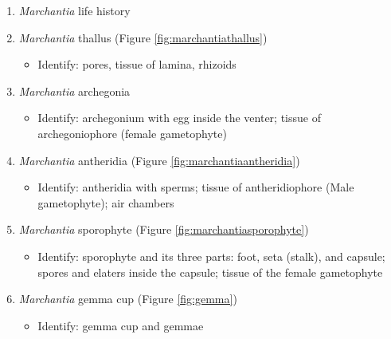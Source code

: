 \documentclass[]{book}
\providecommand{\tightlist}{%
  \setlength{\itemsep}{0pt}\setlength{\parskip}{0pt}}
\theoremstyle{definition}
\theoremstyle{definition}
\theoremstyle{definition}
\theoremstyle{remark}
\begin{document}
\begin{enumerate}
\def\labelenumi{\arabic{enumi}.}
\tightlist
\item
  \emph{Marchantia} life history
\item
  \emph{Marchantia} thallus (Figure \ref{fig:marchantiathallus})

  \begin{itemize}
  \tightlist
  \item
    Identify: pores, tissue of lamina, rhizoids
  \end{itemize}
\item
  \emph{Marchantia} archegonia

  \begin{itemize}
  \tightlist
  \item
    Identify: archegonium with egg inside the venter; tissue of
    archegoniophore (female gametophyte)
  \end{itemize}
\item
  \emph{Marchantia} antheridia (Figure \ref{fig:marchantiaantheridia})

  \begin{itemize}
  \tightlist
  \item
    Identify: antheridia with sperms; tissue of antheridiophore (Male
    gametophyte); air chambers
  \end{itemize}
\item
  \emph{Marchantia} sporophyte (Figure \ref{fig:marchantiasporophyte})

  \begin{itemize}
  \tightlist
  \item
    Identify: sporophyte and its three parts: foot, seta (stalk), and
    capsule; spores and elaters inside the capsule; tissue of the female
    gametophyte
  \end{itemize}
\item
  \emph{Marchantia} gemma cup (Figure \ref{fig:gemma})

  \begin{itemize}
  \tightlist
  \item
    Identify: gemma cup and gemmae
  \end{itemize}
\end{enumerate}
\end{document}
